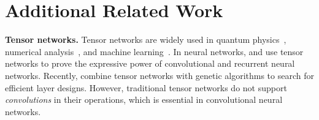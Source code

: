 \section{Additional Related Work}\label{app:add_related_work}


\textbf{Tensor networks.}
Tensor networks are widely used in quantum physics~\citep{orus2014practical}, 
numerical analysis~\citep{grasedyck2013literature}, and machine learning~\citep{cichocki2016tensor,cichocki2017tensor}. 
In neural networks, \citet{cohen2016convolutional} and \citet{khrulkov2018expressive} 
use tensor networks to prove the expressive power of convolutional and recurrent neural networks. Recently, \citet{hayashi2019exploring} combine tensor networks with genetic algorithms to search for efficient layer designs.
However, traditional tensor networks do not support {\em convolutions} in their operations, which is essential in convolutional neural networks. 